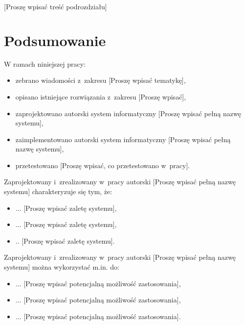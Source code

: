 \documentclass{PracaDyplomowa-Szablon}
\begin{document}
[Proszę wpisać treść podrozdziału]

\cleardoublepage
\chapter{Podsumowanie}


W ramach niniejszej pracy:

\begin{itemize}
\item zebrano wiadomości z~zakresu [Proszę wpisać tematykę],
\item opisano istniejące rozwiązania z~zakresu [Proszę wpisać],
\item zaprojektowano autorski system informatyczny [Proszę wpisać pełną nazwę systemu],
\item zaimplementowano autorski system informatyczny [Proszę wpisać pełną nazwę systemu],
\item przetestowano [Proszę wpisać, co przetestowano w~pracy].
\end{itemize}

Zaprojektowany i~zrealizowany w~pracy autorski [Proszę wpisać pełną nazwę systemu] charakteryzuje się tym, że:

\begin{itemize}
\item ... [Proszę wpisać zaletę systemu],
\item ... [Proszę wpisać zaletę systemu],
\item .. [Proszę wpisać zaletę systemu].
\end{itemize}

Zaprojektowany i~zrealizowany w~pracy autorski [Proszę wpisać pełną nazwę systemu] można wykorzystać m.in. do:

\begin{itemize}
\item ... [Proszę wpisać potencjalną możliwość zastosowania],
\item ... [Proszę wpisać potencjalną możliwość zastosowania],
\item ... [Proszę wpisać potencjalną możliwość zastosowania].
\end{itemize}
\end{document}
